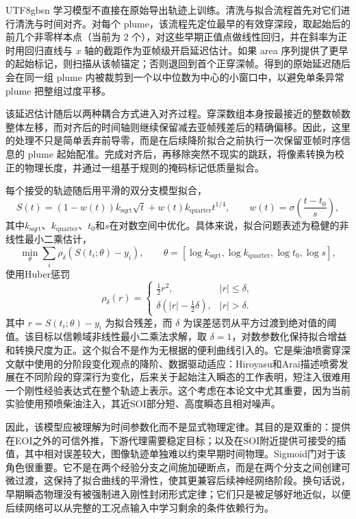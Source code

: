 \documentclass[english, 12pt, a4paper, elec, utf8, a-2b, online]{aaltothesis}
\begin{document}
\begin{CJK*}{UTF8}{gbsn}
学习模型不直接在原始导出轨迹上训练。清洗与拟合流程首先对它们进行清洗与时间对齐。对每个 plume，该流程先定位最早的有效穿深段，取起始后的前几个非零样本点（当前为 2 个），对这些早期正值点做线性回归，并在斜率为正时用回归直线与 \(x\) 轴的截距作为亚帧级开启延迟估计。如果 area 序列提供了更早的起始标记，则扫描从该帧锚定；否则退回到首个正穿深帧。得到的原始延迟随后会在同一组 plume 内被裁剪到一个以中位数为中心的小窗口中，以避免单条异常 plume 把整组过度平移。

该延迟估计随后以两种耦合方式进入对齐过程。穿深数组本身按最接近的整数帧数整体左移，而对齐后的时间轴则继续保留减去亚帧残差后的精确偏移。因此，这里的处理不只是简单丢弃前导零，而是在后续降阶拟合之前执行一次保留亚帧时序信息的 plume 起始配准。完成对齐后，再移除突然不现实的跳跃，将像素转换为校正的物理长度，并通过一组基于规则的掩码标记低质量拟合。

每个接受的轨迹随后用平滑的双分支模型拟合，
\[
S(t)=\left(1-w(t)\right)k_{\mathrm{sqrt}}\sqrt{t}
+w(t)k_{\mathrm{quarter}}t^{1/4},
\qquad
w(t)=\sigma\!\left(\frac{t-t_0}{s}\right),
\]
其中\(k_{\mathrm{sqrt}}\)、\(k_{\mathrm{quarter}}\)、\(t_0\)和\(s\)在对数空间中优化。具体来说，拟合问题表述为稳健的非线性最小二乘估计，
\[
\min_{\theta}
\sum_i \rho_\delta\!\left(S(t_i;\theta)-y_i\right),
\qquad
\theta=
\left[\log k_{\mathrm{sqrt}},\log k_{\mathrm{quarter}},\log t_0,\log s\right],
\]
使用Huber惩罚
\[
\rho_\delta(r)=
\begin{cases}
\tfrac{1}{2}r^2, & |r|\le \delta,\\
\delta\left(|r|-\tfrac{1}{2}\delta\right), & |r|>\delta.
\end{cases}
\]
其中 \(r = S(t_i;\theta)-y_i\) 为拟合残差，而 \(\delta\) 为误差惩罚从平方过渡到绝对值的阈值。该目标以信赖域非线性最小二乘法求解，取 \(\delta=1\)，对数参数化保持拟合增益和转换尺度为正\cite{Huber1964,NocedalWright2006}。这个拟合不是作为无根据的便利曲线引入的。它是柴油喷雾穿深文献中使用的分阶段变化观点的降阶、数据驱动适应：Hiroyasu和Arai描述喷雾发展在不同阶段的穿深行为变化\cite{HiroyasuArai1990}，后来关于起始注入瞬态的工作表明，短注入很难用一个刚性经验表达式在整个轨迹上表示\cite{ZhouLiYi2021}。这个考虑在本论文中尤其重要，因为当前实验使用预喷柴油注入，其近SOI部分短、高度瞬态且相对噪声。

因此，该模型应被理解为时间参数化而不是显式物理定律。其目的是双重的：提供在EOI之外的可信外推，下游代理需要稳定目标；以及在SOI附近提供可接受的插值，其中相对误差较大，图像轨迹单独难以约束早期时间物理。Sigmoid门对于该角色很重要。它不是在两个经验分支之间施加硬断点，而是在两个分支之间创建可微过渡，这保持了拟合曲线的平滑性，使其更兼容后续神经网络阶段。换句话说，早期瞬态物理没有被强制进入刚性封闭形式定律；它们只是被足够好地近似，以便后续网络可以从完整的工况点输入中学习剩余的条件依赖行为。


\end{CJK*}
\end{document}
